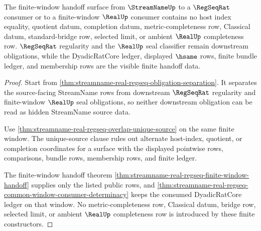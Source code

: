 \begin{theorem}
\label{thm:streamname-regseqrat-no-extra-data-exclusion}
The finite-window handoff surface from $\StreamNameUp$ to a $\RegSeqRat$
consumer or to a finite-window $\RealUp$ consumer contains no host index
equality, quotient datum, completion datum, metric-completeness row, Classical
datum, standard-bridge row, selected limit, or ambient $\RealUp$ completeness
row. $\RegSeqRat$ regularity and the $\RealUp$ seal classifier remain downstream
obligations, while the DyadicRatCore ledger, displayed $\hsame$ rows, finite
bundle ledger, and membership rows are the visible finite handoff data.
\end{theorem}
\begin{proof}
Start from
\autoref{thm:streamname-real-regseq-obligation-separation}. It separates the
source-facing StreamName rows from downstream $\RegSeqRat$ regularity and
finite-window $\RealUp$ seal obligations, so neither downstream obligation can
be read as hidden StreamName source data.

Use \autoref{thm:streamname-real-regseq-overlap-unique-source} on the same
finite window. The unique-source clause rules out alternate host-index,
quotient, or completion coordinates for a surface with the displayed pointwise
rows, comparisons, bundle rows, membership rows, and finite ledger.

The finite-window handoff theorem
\autoref{thm:streamname-real-regseq-finite-window-handoff} supplies only the
listed public rows, and
\autoref{thm:streamname-real-regseq-common-window-consumer-determinacy} keeps
the consumed DyadicRatCore ledger on that window. No metric-completeness row,
Classical datum, bridge row, selected limit, or ambient $\RealUp$ completeness
row is introduced by these finite constructors.
\end{proof}

